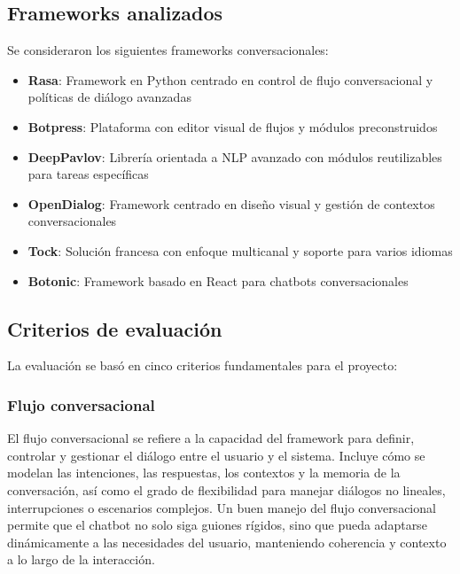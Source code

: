 \subsection{Frameworks analizados}\label{subsec:frameworks-analizados}

Se consideraron los siguientes frameworks conversacionales:

\begin{itemize}
    \item \textbf{Rasa}: Framework en Python centrado en control de flujo conversacional y políticas de diálogo avanzadas
    \item \textbf{Botpress}: Plataforma con editor visual de flujos y módulos preconstruidos
    \item \textbf{DeepPavlov}: Librería orientada a NLP avanzado con módulos reutilizables para tareas específicas
    \item \textbf{OpenDialog}: Framework centrado en diseño visual y gestión de contextos conversacionales
    \item \textbf{Tock}: Solución francesa con enfoque multicanal y soporte para varios idiomas
    \item \textbf{Botonic}: Framework basado en React para chatbots conversacionales
\end{itemize}

\subsection{Criterios de evaluación}\label{subsec:criterios-evaluacion}

La evaluación se basó en cinco criterios fundamentales para el proyecto:

\subsubsection{Flujo conversacional}

El flujo conversacional se refiere a la capacidad del framework para definir, controlar y gestionar el diálogo entre el usuario y el sistema. Incluye cómo se modelan las intenciones, las respuestas, los contextos y la memoria de la conversación, así como el grado de flexibilidad para manejar diálogos no lineales, interrupciones o escenarios complejos. Un buen manejo del flujo conversacional permite que el chatbot no solo siga guiones rígidos, sino que pueda adaptarse dinámicamente a las necesidades del usuario, manteniendo coherencia y contexto a lo largo de la interacción.

